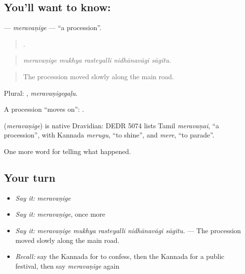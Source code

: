 \subsection*{You'll want to know: }
\textbf{} — \emph{meravaṇige} — \textquotedblleft{}a procession\textquotedblright{}.

\begin{quote}
    .
\end{quote}

\begin{quote}
\emph{meravaṇige mukhya rasteyalli nidhānavāgi sāgitu.}
\end{quote}

\begin{quote}
The procession moved slowly along the main road.
\end{quote}

Plural: , \emph{meravaṇigegaḷu}.

A procession \textquotedblleft{}moves on\textquotedblright{}:  .

\begin{cousinweb}
\textbf{} (\emph{meravaṇige}) is native Dravidian: DEDR 5074 lists Tamil \emph{meravaṇai}, \textquotedblleft{}a procession\textquotedblright{}, with Kannada \emph{merugu}, \textquotedblleft{}to shine\textquotedblright{}, and \emph{mere}, \textquotedblleft{}to parade\textquotedblright{}.
\end{cousinweb}

\begin{grammarlens}[title={What you've built}]
One more word for telling what happened.
\end{grammarlens}

\subsection*{Your turn}
\begin{itemize}
\raggedright
  \item \emph{Say it:} \emph{meravaṇige}
  \item \emph{Say it:} \emph{meravaṇige}, once more
  \item \emph{Say it:} \emph{meravaṇige mukhya rasteyalli nidhānavāgi sāgitu.} — The procession moved slowly along the main road.
  \item \emph{Recall:} say the Kannada for to confess, then the Kannada for a public festival, then say \emph{meravaṇige} again
\end{itemize}

